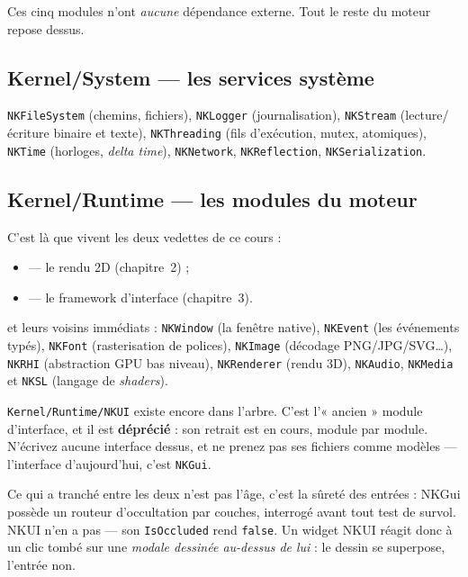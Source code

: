 Ces cinq modules n'ont \emph{aucune} dépendance externe. Tout le reste du moteur
repose dessus.

\subsection{Kernel/System — les services système}

\texttt{NKFileSystem} (chemins, fichiers), \texttt{NKLogger} (journalisation),
\texttt{NKStream} (lecture/écriture binaire et texte), \texttt{NKThreading}
(fils d'exécution, mutex, atomiques), \texttt{NKTime} (horloges, \emph{delta
time}), \texttt{NKNetwork}, \texttt{NKReflection}, \texttt{NKSerialization}.

\subsection{Kernel/Runtime — les modules du moteur}

C'est là que vivent les deux vedettes de ce cours :

\begin{itemize}
  \item {} — le rendu 2D (chapitre~2) ;
  \item {} — le framework d'interface (chapitre~3).
\end{itemize}

et leurs voisins immédiats : \texttt{NKWindow} (la fenêtre native),
\texttt{NKEvent} (les événements typés), \texttt{NKFont} (rasterisation de
polices), \texttt{NKImage} (décodage PNG/JPG/SVG\dots), \texttt{NKRHI}
(abstraction GPU bas niveau), \texttt{NKRenderer} (rendu 3D), \texttt{NKAudio},
\texttt{NKMedia} et \texttt{NKSL} (langage de \emph{shaders}).

\begin{nkpiege}
\texttt{Kernel/Runtime/NKUI} existe encore dans l'arbre. C'est l'« ancien »
module d'interface, et il est \textbf{déprécié} : son retrait est en cours,
module par module. N'écrivez aucune interface dessus, et ne prenez pas ses
fichiers comme modèles --- l'interface d'aujourd'hui, c'est \texttt{NKGui}.

Ce qui a tranché entre les deux n'est pas l'âge, c'est la sûreté des entrées :
NKGui possède un routeur d'occultation par couches, interrogé avant tout
test de survol. NKUI n'en a pas --- son \texttt{IsOccluded} rend
\texttt{false}. Un widget NKUI réagit donc à un clic tombé sur une
\emph{modale dessinée au-dessus de lui} : le dessin se superpose, l'entrée
non.
\end{nkpiege}

